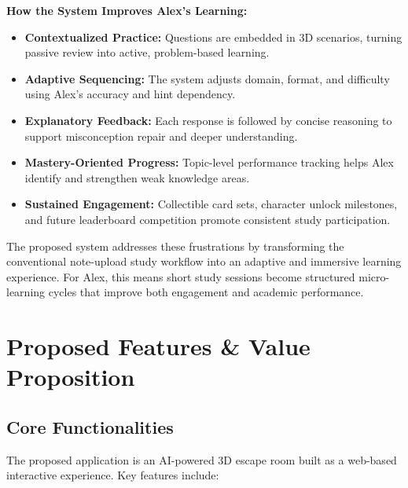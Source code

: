 \documentclass[12pt]{article}
\begin{document}
\textbf{How the System Improves Alex's Learning:}
\begin{itemize}
    \item \textbf{Contextualized Practice:} Questions are embedded in 3D scenarios, turning passive review into active, problem-based learning.
    \item \textbf{Adaptive Sequencing:} The system adjusts domain, format, and difficulty using Alex's accuracy and hint dependency.
    \item \textbf{Explanatory Feedback:} Each response is followed by concise reasoning to support misconception repair and deeper understanding.
    \item \textbf{Mastery-Oriented Progress:} Topic-level performance tracking helps Alex identify and strengthen weak knowledge areas.
    \item \textbf{Sustained Engagement:} Collectible card sets, character unlock milestones, and future leaderboard competition promote consistent study participation.
\end{itemize}

The proposed system addresses these frustrations by transforming the conventional note-upload study workflow into an adaptive and immersive learning experience. For Alex, this means short study sessions become structured micro-learning cycles that improve both engagement and academic performance.

\section{Proposed Features \& Value Proposition}

\subsection{Core Functionalities}

The proposed application is an AI-powered 3D escape room built as a web-based interactive experience. Key features include:
\end{document}

